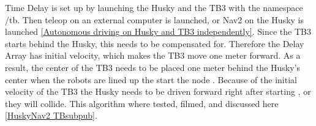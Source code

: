 Time Delay is set up by launching the Husky and the TB3 with the namespace /tb. Then teleop on an external computer is launched, or Nav2 on the Husky is launched \ref{Autonomous driving on Husky and TB3 independently}. Since the TB3 starts behind the Husky, this needs to be compensated for. Therefore the Delay Array has initial velocity, which makes the TB3 move one meter forward. As a result, the center of the TB3 needs to be placed one meter behind the Husky's center when the robots are lined up the start the node . Because of the initial velocity of the TB3 the Husky needs to be driven forward right after starting , or they will collide. This algorithm where tested, filmed, and discussed here \ref{HuskyNav2 TBsubpub}. 